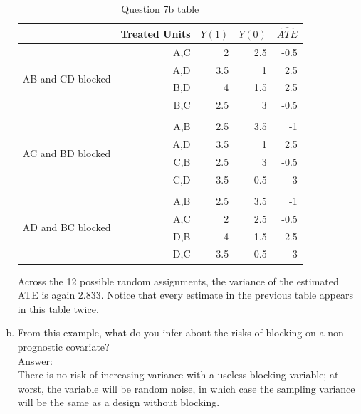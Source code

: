 \documentclass[11pt,notitlepage]{article}\usepackage[]{graphicx}\usepackage[]{color}
\begin{document}
\begin{enumerate}[a)]
\begin{table}[H]
  \centering
  \caption{Question 7b table}
    \begin{tabular}{rrrrr}
    \toprule
          & Treated Units     &  $\bar{Y(1)}$ &  $\bar{Y(0)}$ &  $\widehat{ATE}$ \\
    \midrule
    \multicolumn{1}{c}{\multirow{4}[0]{*}{AB and CD blocked}} & A,C   & 2     & 2.5   & -0.5 \\
    \multicolumn{1}{c}{} & A,D   & 3.5   & 1     & 2.5 \\
    \multicolumn{1}{c}{} & B,D   & 4     & 1.5   & 2.5 \\
    \multicolumn{1}{c}{} & B,C   & 2.5   & 3     & -0.5 \\
          &       &       &       &  \\
    \multicolumn{1}{c}{\multirow{4}[0]{*}{AC and BD blocked}} & A,B   & 2.5   & 3.5   & -1 \\
    \multicolumn{1}{c}{} & A,D   & 3.5   & 1     & 2.5 \\
    \multicolumn{1}{c}{} & C,B   & 2.5   & 3     & -0.5 \\
    \multicolumn{1}{c}{} & C,D   & 3.5   & 0.5   & 3 \\
          &       &       &       &  \\
    \multicolumn{1}{c}{\multirow{4}[0]{*}{AD and BC blocked}} & A,B   & 2.5   & 3.5   & -1 \\
    \multicolumn{1}{c}{} & A,C   & 2     & 2.5   & -0.5 \\
    \multicolumn{1}{c}{} & D,B   & 4     & 1.5   & 2.5 \\
    \multicolumn{1}{c}{} & D,C   & 3.5   & 0.5   & 3 \\
    \bottomrule
    \end{tabular}%
  \label{tab:addlabel}%
\end{table}%

Across the 12 possible random assignments, the variance of the estimated ATE is again 2.833.  Notice that every estimate in the previous table appears in this table twice.

\item From this example, what do you infer about the risks of blocking on a non-prognostic covariate?\\
Answer:\\
There is no risk of increasing variance with a useless blocking variable; at worst, the variable will be random noise, in which case the sampling variance will be the same as a design without blocking.
\end{enumerate}
\end{document}
